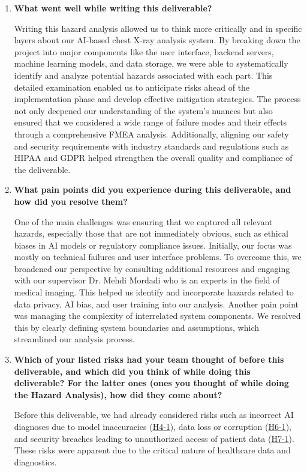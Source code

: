 \documentclass{article}
\begin{document}
\begin{enumerate}
    
    \item \textbf{What went well while writing this deliverable?}

    Writing this hazard analysis allowed us to think more critically and in specific layers about our AI-based chest X-ray analysis system. By breaking down the project into major components like the user interface, backend servers, machine learning models, and data storage, we were able to systematically identify and analyze potential hazards associated with each part. This detailed examination enabled us to anticipate risks ahead of the implementation phase and develop effective mitigation strategies. The process not only deepened our understanding of the system's nuances but also ensured that we considered a wide range of failure modes and their effects through a comprehensive FMEA analysis. Additionally, aligning our safety and security requirements with industry standards and regulations such as HIPAA and GDPR helped strengthen the overall quality and compliance of the deliverable.
    \item \textbf{What pain points did you experience during this deliverable, and how
    did you resolve them?}

    One of the main challenges was ensuring that we captured all relevant hazards, especially those that are not immediately obvious, such as ethical biases in AI models or regulatory compliance issues. Initially, our focus was mostly on technical failures and user interface problems. To overcome this, we broadened our perspective by consulting additional resources and engaging with our supervisor Dr. Mehdi Mordadi who is an experts in the field of medical imaging. This helped us identify and incorporate hazards related to data privacy, AI bias, and user training into our analysis. Another pain point was managing the complexity of interrelated system components. We resolved this by clearly defining system boundaries and assumptions, which streamlined our analysis process.
    \item \textbf{Which of your listed risks had your team thought of before this
    deliverable, and which did you think of while doing this deliverable? For
    the latter ones (ones you thought of while doing the Hazard Analysis), how
    did they come about?}

    Before this deliverable, we had already considered risks such as incorrect AI diagnoses due to model inaccuracies (\hyperlink{H4-1}{H4-1}), data loss or corruption (\hyperlink{H6-1}{H6-1}), and security breaches leading to unauthorized access of patient data (\hyperlink{H7-1}{H7-1}). These risks were apparent due to the critical nature of healthcare data and diagnostics.


\end{enumerate}
\end{document}
